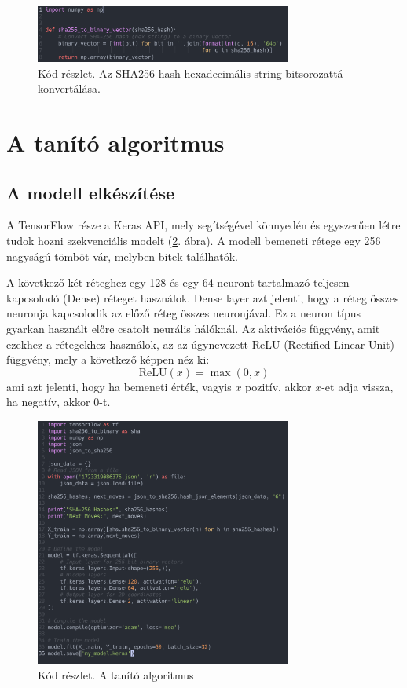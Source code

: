 \begin{figure}[h]
    \center
    \includegraphics[width=0.75\textwidth]{img/hash_to_bit.png}
    \caption{Kód részlet. Az SHA256 hash hexadecimális string bitsorozattá konvertálása.}
    \label{code:hash_to_bit}
\end{figure}

\section{A tanító algoritmus}

\subsection{A modell elkészítése}
A TensorFlow része a Keras API, mely segítségével könnyedén és egyszerűen létre tudok hozni szekvenciális modelt (\ref{code:tensor}. ábra). A modell bemeneti rétege egy 256 nagyságú tömböt vár, melyben bitek találhatók. 

A következő két réteghez egy 128 és egy 64 neuront tartalmazó teljesen kapcsolodó (Dense) réteget használok. Dense layer azt jelenti, hogy a réteg összes neuronja kapcsolodik az előző réteg összes neuronjával. Ez a neuron típus gyarkan használt előre csatolt neurális hálóknál.
Az aktivációs függvény, amit ezekhez a rétegekhez használok, az az úgynevezett 
ReLU (Rectified Linear Unit) függvény, mely a következő képpen néz ki:
\[ \text{ReLU}(x) = \max(0, x) \]
ami azt jelenti, hogy ha bemeneti érték, vagyis $x$ pozitív, akkor $x$-et adja vissza, ha negatív, akkor 0-t. 


\begin{figure}[h]
    \includegraphics[width=0.75\textwidth]{img/Tensor.png}
    \caption{Kód részlet. A tanító algoritmus}
    \label{code:tensor}
\end{figure}

